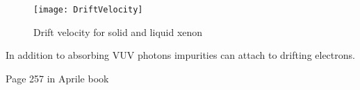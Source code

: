 \begin{figure}
\texttt{[image: DriftVelocity]}
\caption{Drift velocity for solid and liquid xenon}
\label{fig:drift_velocity}
\end{figure}
In addition to absorbing VUV photons impurities can attach to drifting electrons.






Page 257 in Aprile book